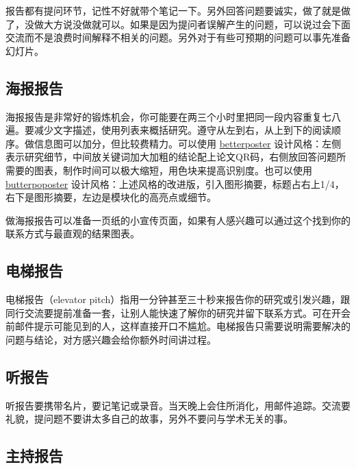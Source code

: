 \documentclass[]{tufte-book}
\begin{document}
报告都有提问环节，记性不好就带个笔记一下。另外回答问题要诚实，做了就是做了，没做大方说没做就可以。如果是因为提问者误解产生的问题，可以说过会下面交流而不是浪费时间解释不相关的问题。另外对于有些可预期的问题可以事先准备幻灯片。

\hypertarget{ux6d77ux62a5ux62a5ux544a}{%
\subsection{海报报告}\label{ux6d77ux62a5ux62a5ux544a}}

海报报告是非常好的锻炼机会，你可能要在两三个小时里把同一段内容重复七八遍。要减少文字描述，使用列表来概括研究。遵守从左到右，从上到下的阅读顺序。做信息图可以加分，但比较费精力。可以使用 \href{https://www.insidehighered.com/news/2019/06/24/theres-movement-better-scientific-posters-are-they-really-better}{betterposter} 设计风格：左侧表示研究细节，中间放关键词加大加粗的结论配上论文QR码，右侧放回答问题所需要的图表，制作时间可以极大缩短，用色块来提高识别度。也可以使用 \href{https://derekcrowe.net/butterposter}{butterpoposter} 设计风格：上述风格的改进版，引入图形摘要，标题占右上1/4，右下是图形摘要，左边是模块化的高亮点或细节。

做海报报告可以准备一页纸的小宣传页面，如果有人感兴趣可以通过这个找到你的联系方式与最直观的结果图表。

\hypertarget{ux7535ux68afux62a5ux544a}{%
\subsection{电梯报告}\label{ux7535ux68afux62a5ux544a}}

电梯报告（elevator pitch）指用一分钟甚至三十秒来报告你的研究或引发兴趣，跟同行交流要提前准备一套，让别人能快速了解你的研究并留下联系方式。可在开会前邮件提示可能见到的人，这样直接开口不尴尬。电梯报告只需要说明需要解决的问题与结论，对方感兴趣会给你额外时间讲过程。

\hypertarget{ux542cux62a5ux544a}{%
\subsection{听报告}\label{ux542cux62a5ux544a}}

听报告要携带名片，要记笔记或录音。当天晚上会住所消化，用邮件追踪。交流要礼貌，提问题不要讲太多自己的故事，另外不要问与学术无关的事。

\hypertarget{ux4e3bux6301ux62a5ux544a}{%
\subsection{主持报告}\label{ux4e3bux6301ux62a5ux544a}}
\end{document}
